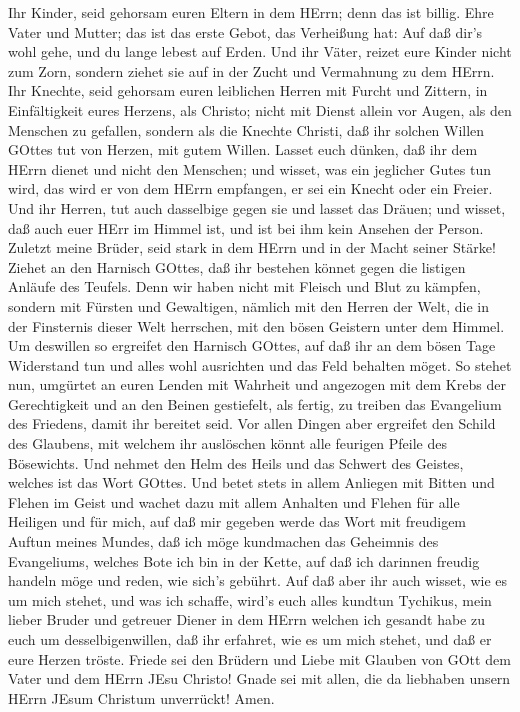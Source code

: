  Ihr Kinder, seid gehorsam euren Eltern in dem HErrn; denn
das ist billig.  Ehre Vater und Mutter; das ist das erste
Gebot, das Verheißung hat:  Auf daß dir's wohl gehe, und du
lange lebest auf Erden.  Und ihr Väter, reizet eure Kinder
nicht zum Zorn, sondern ziehet sie auf in der Zucht und Vermahnung zu
dem HErrn.  Ihr Knechte, seid gehorsam euren leiblichen
Herren mit Furcht und Zittern, in Einfältigkeit eures Herzens, als
Christo;  nicht mit Dienst allein vor Augen, als den
Menschen zu gefallen, sondern als die Knechte Christi, daß ihr solchen
Willen GOttes tut von Herzen, mit gutem Willen.  Lasset euch
dünken, daß ihr dem HErrn dienet und nicht den Menschen; 
und wisset, was ein jeglicher Gutes tun wird, das wird er von dem HErrn
empfangen, er sei ein Knecht oder ein Freier.  Und ihr
Herren, tut auch dasselbige gegen sie und lasset das Dräuen; und wisset,
daß auch euer HErr im Himmel ist, und ist bei ihm kein Ansehen der
Person.  Zuletzt meine Brüder, seid stark in dem HErrn und
in der Macht seiner Stärke!  Ziehet an den Harnisch GOttes,
daß ihr bestehen könnet gegen die listigen Anläufe des Teufels.
 Denn wir haben nicht mit Fleisch und Blut zu kämpfen,
sondern mit Fürsten und Gewaltigen, nämlich mit den Herren der Welt, die
in der Finsternis dieser Welt herrschen, mit den bösen Geistern unter
dem Himmel.  Um deswillen so ergreifet den Harnisch GOttes,
auf daß ihr an dem bösen Tage Widerstand tun und alles wohl ausrichten
und das Feld behalten möget.  So stehet nun, umgürtet an
euren Lenden mit Wahrheit und angezogen mit dem Krebs der Gerechtigkeit
 und an den Beinen gestiefelt, als fertig, zu treiben das
Evangelium des Friedens, damit ihr bereitet seid.  Vor
allen Dingen aber ergreifet den Schild des Glaubens, mit welchem ihr
auslöschen könnt alle feurigen Pfeile des Bösewichts.  Und
nehmet den Helm des Heils und das Schwert des Geistes, welches ist das
Wort GOttes.  Und betet stets in allem Anliegen mit Bitten
und Flehen im Geist und wachet dazu mit allem Anhalten und Flehen für
alle Heiligen  und für mich, auf daß mir gegeben werde das
Wort mit freudigem Auftun meines Mundes, daß ich möge kundmachen das
Geheimnis des Evangeliums,  welches Bote ich bin in der
Kette, auf daß ich darinnen freudig handeln möge und reden, wie sich's
gebührt.  Auf daß aber ihr auch wisset, wie es um mich
stehet, und was ich schaffe, wird's euch alles kundtun Tychikus, mein
lieber Bruder und getreuer Diener in dem HErrn  welchen ich
gesandt habe zu euch um desselbigenwillen, daß ihr erfahret, wie es um
mich stehet, und daß er eure Herzen tröste.  Friede sei den
Brüdern und Liebe mit Glauben von GOtt dem Vater und dem HErrn JEsu
Christo!  Gnade sei mit allen, die da liebhaben unsern
HErrn JEsum Christum unverrückt! Amen.
